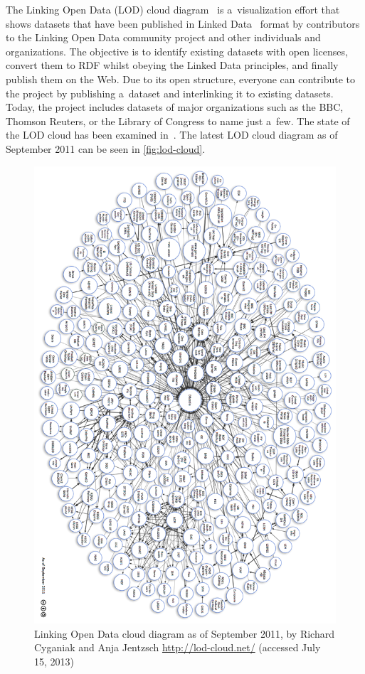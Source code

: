 The Linking Open Data (LOD) cloud
diagram~\cite{cyganiak2011lodcloud} is a~visualization effort
that shows datasets that have been published in
Linked Data~\cite{bernerslee2006linkeddata}
format by contributors to the Linking Open Data community project
and other individuals and organizations.
The objective is to identify existing datasets with open licenses,
convert them to RDF whilst obeying the Linked Data principles,
and finally publish them on the Web.
Due to its open structure, everyone can contribute to the project by publishing a~dataset and
interlinking it to existing datasets.
Today, the project includes datasets of major organizations
such as the BBC, Thomson Reuters, or the Library of Congress
to name just a~few.
The state of the LOD cloud has been examined
in~\cite{bizer2011statelodcloud}.
The latest LOD cloud diagram as of September 2011 can be seen in \autoref{fig:lod-cloud}.

\begin{figure}[!ht]
\centering  \includegraphics[height=0.8\textheight,keepaspectratio]{lod-cloud.png}    
  \caption[Linking Open Data cloud diagram as of September 2011]
  {Linking Open Data cloud diagram as of September 2011, by Richard Cyganiak and Anja Jentzsch \url{http://lod-cloud.net/} (accessed July 15, 2013) }    
  \label{fig:lod-cloud}
\end{figure}

